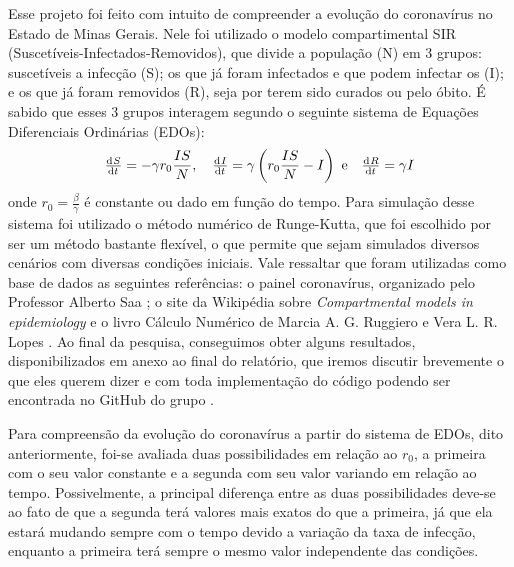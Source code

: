 \documentclass[11pt, a4paper]{article}
\begin{document}


Esse projeto foi feito com intuito de compreender a evolução do coronavírus no Estado de Minas Gerais.
Nele foi utilizado o modelo compartimental SIR (Suscetíveis-Infectados-Removidos), que divide a população (N) em 3 grupos: suscetíveis a infecção (S); os que já foram infectados e que podem infectar os  (I); e os que já foram removidos (R), seja por terem sido curados ou pelo óbito. 
É sabido que esses 3 grupos interagem segundo o seguinte sistema de Equações Diferenciais Ordinárias (EDOs):
\[
	\od{S}{t} = - \gamma r_0 \frac{IS}{N} , \quad
	\od{I}{t} = \gamma \left( r_0 \frac{IS}{N} - I \right) \text{ e} \quad
	\od{R}{t} = \gamma I
\]
onde $r_0 = \frac{\beta}{\gamma}$ é constante ou dado em função do tempo. 
Para simulação desse sistema foi utilizado o método numérico de Runge-Kutta, que foi escolhido por ser um método bastante flexível, o que permite que sejam simulados  diversos cenários com diversas condições iniciais.
Vale ressaltar que foram utilizadas como base de dados as seguintes referências:
o painel coronavírus, organizado pelo Professor Alberto Saa \cite{painel_covid};
o site da Wikipédia sobre \emph{Compartmental models in epidemiology} \cite{model}
e o livro Cálculo Numérico de Marcia A. G. Ruggiero e Vera L. R. Lopes \cite{calc_num}.
Ao final da pesquisa, conseguimos obter alguns resultados, disponibilizados em anexo ao final do relatório, que iremos discutir brevemente o que eles querem dizer e com toda implementação do código podendo ser encontrada no GitHub do grupo \cite{git_grupo}.

Para compreensão da evolução do coronavírus a partir do sistema de EDOs, dito anteriormente, foi-se avaliada duas possibilidades em relação ao $r_0$, a primeira com o seu valor constante e a segunda com seu valor variando em relação ao tempo.
Possivelmente, a principal diferença entre as duas possibilidades deve-se ao fato de que a segunda terá valores mais exatos do que a primeira, já que ela estará mudando sempre com o tempo devido a variação da taxa de infecção, enquanto a primeira terá sempre o mesmo valor independente das condições.
\end{document}
